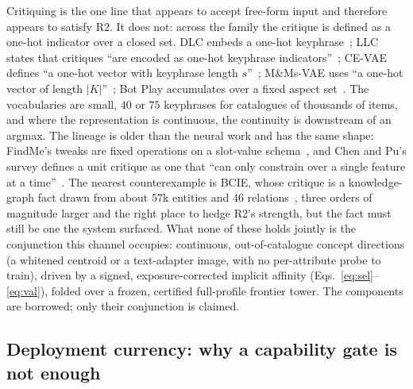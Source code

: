 \documentclass[manuscript,screen]{acmart}
\begin{document}
Critiquing is the one line that appears to accept free-form input and therefore appears to satisfy R2. It does not: across the family the critique is defined as a one-hot indicator over a closed set. DLC embeds a one-hot keyphrase~\citep{wu2019dlc}; LLC states that critiques ``are encoded as one-hot keyphrase indicators''~\citep{luo2020llc}; CE-VAE defines ``a one-hot vector with keyphrase length $s$''~\citep{luo2020cevae}; M\&Ms-VAE uses ``a one-hot vector of length $|K|$''~\citep{antognini2021mmvae}; Bot Play accumulates over a fixed aspect set~\citep{li2021botplay}. The vocabularies are small, $40$ or $75$ keyphrases for catalogues of thousands of items, and where the representation is continuous, the continuity is downstream of an argmax. The lineage is older than the neural work and has the same shape: FindMe's tweaks are fixed operations on a slot-value schema~\citep{burke1996findme}, and Chen and Pu's survey defines a unit critique as one that ``can only constrain over a single feature at a time''~\citep{chenpu2012critiquing}. The nearest counterexample is BCIE, whose critique is a knowledge-graph fact drawn from about $57$k entities and $46$ relations~\citep{toroghi2023bcie}, three orders of magnitude larger and the right place to hedge R2's strength, but the fact must still be one the system surfaced. What none of these holds jointly is the conjunction this channel occupies: continuous, out-of-catalogue concept directions (a whitened centroid or a text-adapter image, with no per-attribute probe to train), driven by a signed, exposure-corrected implicit affinity (Eqs.~\eqref{eq:sel}--\eqref{eq:val}), folded over a frozen, certified full-profile frontier tower. The components are borrowed; only their conjunction is claimed.

\subsection{Deployment currency: why a capability gate is not enough}\label{sec:concept:deploy}
\end{document}
